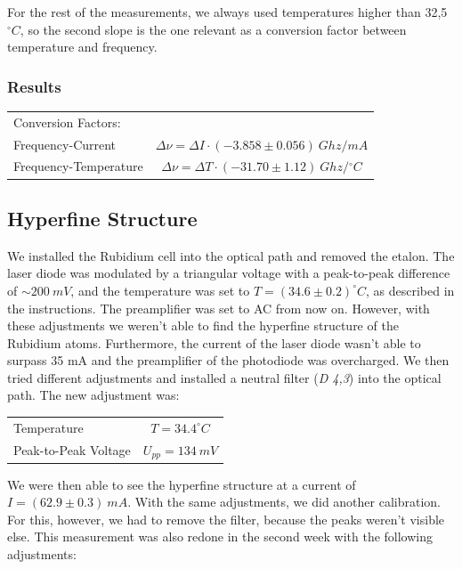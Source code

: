 For the rest of the measurements, we always used temperatures higher than 32,5 $^\circ C$, so the second slope is the one relevant as a conversion factor between temperature and frequency.

\subsubsection{Results}

\begin{tabular}[H]{l c}
Conversion Factors: & \\
Frequency-Current & $\Delta\nu = \Delta I \cdot (-3.858 \pm 0.056)\ {Ghz}/{mA}$\\
Frequency-Temperature & $\Delta\nu = \Delta T \cdot (-31.70 \pm 1.12)\ {Ghz}/{^\circ C}$\\
\end{tabular}


\subsection{Hyperfine Structure} %

We installed the Rubidium cell into the optical path and removed the etalon. The laser diode was modulated by a triangular voltage with a peak-to-peak difference of $\sim 200\ mV$, and the temperature was set to $T = (34.6 \pm 0.2)^\circ C$, as described in the instructions. The preamplifier was set to AC from now on. However, with these adjustments we weren't able to find the hyperfine structure of the Rubidium atoms. Furthermore, the current of the laser diode wasn't able to surpass 35 mA and the preamplifier of the photodiode  was overcharged. We then tried different adjustments and installed a neutral filter (\emph{D 4,3}) into the optical path. The new adjustment was:\\

\begin{center}
\begin{tabular}[H]{l c}
Temperature & $T=34.4 ^\circ C$\\
Peak-to-Peak Voltage & $U_{pp} = 134\ mV$\\
\end{tabular}
\end{center}

We were then able to see the hyperfine structure at a current of $I = (62.9 \pm 0.3)\ mA$. With the same adjustments, we did another calibration. For this, however, we had to remove the filter, because the peaks weren't visible else. This measurement was also redone in the second week with the following adjustments:

